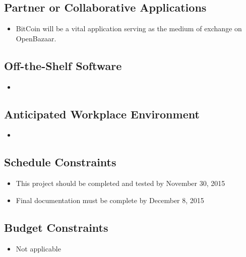 \documentclass{article}
\begin{document}
\subsection{Partner or Collaborative Applications}
\begin{itemize}

\item
BitCoin will be a vital application serving as the medium of exchange on OpenBazaar.

\end{itemize}

\subsection{Off-the-Shelf Software}
\begin{itemize}
	
\item
	
	
\end{itemize}

\subsection{Anticipated Workplace Environment}
\begin{itemize}
	
\item
	
	
\end{itemize}

\subsection{Schedule Constraints}
\begin{itemize}
	
\item
This project should be completed and tested by November 30, 2015

\item
Final documentation must be complete by December 8, 2015
	
\end{itemize}

\subsection{Budget Constraints}
\begin{itemize}
	
\item
Not applicable
	
\end{itemize}
\end{document}
